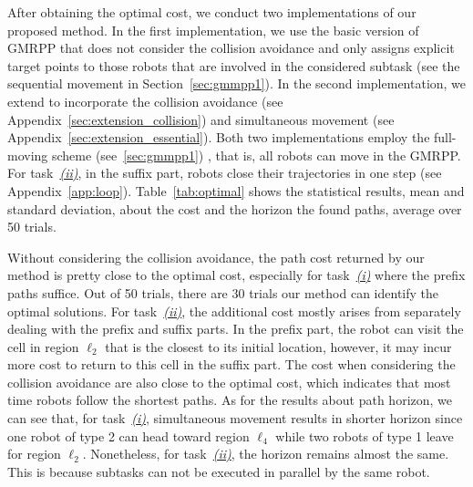 \documentclass[Afour,sageh,times]{sagej}
\begin{document}
{After obtaining the optimal cost, we conduct two implementations of our proposed method. In the first implementation, we use the basic version of GMRPP that does not  consider  the collision avoidance and only assigns explicit target points to those robots that are involved in the considered subtask (see the sequential movement in Section~\ref{sec:gmmpp1}). In the second implementation, we extend to incorporate the collision avoidance (see Appendix~\ref{sec:extension_collision}) and simultaneous movement (see Appendix~\ref{sec:extension_essential}). Both two implementations employ the full-moving scheme (see~\ref{sec:gmmpp1}) , that is, all robots can move in the GMRPP. For task~\hyperref[task:ii]{\it (ii)}, in the suffix part, robots close their trajectories in one step (see Appendix~\ref{app:loop}). Table~\ref{tab:optimal} shows the statistical results, mean and standard deviation, about the cost and the horizon the found paths, average over 50 trials.

Without considering the collision avoidance, the path cost returned by our method is pretty close to the optimal cost, especially for task~\hyperref[task:i]{\it (i)} where the prefix paths suffice. Out of 50 trials, there are 30 trials our method can identify the optimal solutions. For task~\hyperref[task:ii]{\it (ii)}, the additional cost mostly arises from separately dealing with the prefix and suffix parts.  In the prefix part, the robot can visit the cell in region $\ell_2$ that is the closest to its initial location, however, it may incur more cost to return to this cell in the suffix part. The cost when considering the collision avoidance are also close to the optimal cost, which indicates that most time robots follow the shortest paths. As for the results about path horizon, we can see that, for task~\hyperref[task:i]{\it (i)}, simultaneous movement results in shorter horizon since one robot of type 2 can head toward region $\ell_4$ while two robots of type 1 leave for region $\ell_2$. Nonetheless, for task~\hyperref[task:ii]{\it (ii)}, the horizon remains almost the same. This is because subtasks can not be executed in parallel by the same robot.

}
\end{document}
